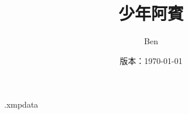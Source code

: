 \begin{filecontents*}{\jobname.xmpdata}
\end{filecontents*}

\documentclass[hyperref]{ctexbook}
\setmainfont{Source Han Serif TW}
\usepackage[a-1b]{pdfx}



\title{{\bfseries 少年阿賓}}
\author{Ben}
\date{版本：\today}
\maketitle
\chapter*{作者有一點話說}

\part{Three Amigo}
\chapter{Candy}
\chapter{筠夢}
\chapter{羚羚}
\part{少年阿賓}
\chapter{房東太太}
\chapter{學姐}
\chapter{初識鈺慧}
\chapter{迷亂舞會}
